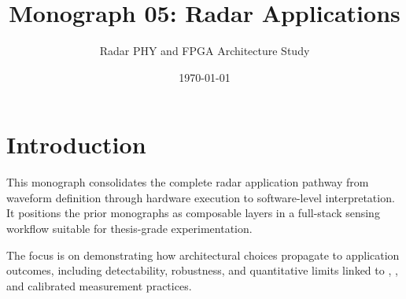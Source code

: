 \documentclass[11pt]{article}
\title{Monograph 05: Radar Applications}
\author{Radar PHY and FPGA Architecture Study}
\date{\today}
\begin{document}
\maketitle

\section{Introduction}
This monograph consolidates the complete radar application pathway from waveform definition through hardware execution to software-level interpretation. It positions the prior monographs as composable layers in a full-stack sensing workflow suitable for thesis-grade experimentation.

The focus is on demonstrating how architectural choices propagate to application outcomes, including detectability, robustness, and quantitative limits linked to \SNR, \ENOB, and calibrated \dBFS measurement practices.



\end{document}
